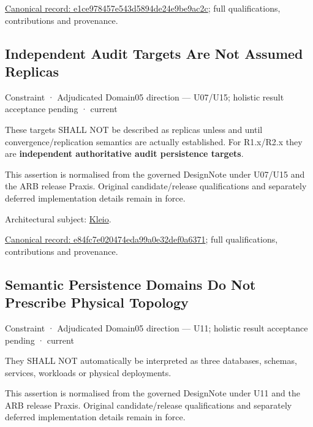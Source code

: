 {\footnotesize \href{../../../../continuum/motivation/constraint/e1ce978457e543d5894de24e9be9ac2c.md}{Canonical record: e1ce978457e543d5894de24e9be9ac2c}; full qualifications, contributions and provenance.}\par
\subsection{Independent Audit Targets Are Not Assumed Replicas}

\label{element:e84fc7e020474eda99a0e32def0a6371}
{\small Constraint · Adjudicated Domain05 direction — U07/U15; holistic result acceptance pending · current}\par

These targets SHALL NOT be described as replicas unless and until convergence/replication semantics are actually established. For R1.x/R2.x they are \textbf{independent authoritative audit persistence targets}.



This assertion is normalised from the governed DesignNote under U07/U15 and the ARB release Praxis. Original candidate/release qualifications and separately deferred implementation details remain in force.



Architectural subject: \hyperref[element:fefda110e2274884ad58906733606efd]{Kleio}.


{\footnotesize \href{../../../../continuum/motivation/constraint/e84fc7e020474eda99a0e32def0a6371.md}{Canonical record: e84fc7e020474eda99a0e32def0a6371}; full qualifications, contributions and provenance.}\par
\subsection{Semantic Persistence Domains Do Not Prescribe Physical Topology}

\label{element:eca9a99c2ad44a1ea7833d2b0c5a3e93}
{\small Constraint · Adjudicated Domain05 direction — U11; holistic result acceptance pending · current}\par

They SHALL NOT automatically be interpreted as three databases, schemas, services, workloads or physical deployments.



This assertion is normalised from the governed DesignNote under U11 and the ARB release Praxis. Original candidate/release qualifications and separately deferred implementation details remain in force.



